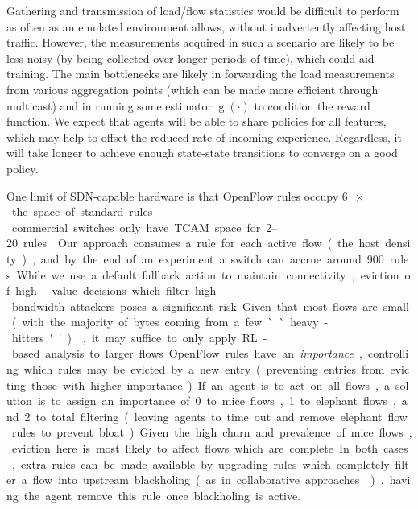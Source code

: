 \documentclass[10pt, times, comsoc]{IEEEtran}
\begin{document}
Gathering and transmission of load/flow statistics would be difficult to perform as often as an emulated environment allows, without inadvertently affecting host traffic.
However, the measurements acquired in such a scenario are likely to be less noisy (by being collected over longer periods of time), which could aid training.
The main bottlenecks are likely in forwarding the load measurements from various aggregation points (which can be made more efficient through multicast) and in running some estimator $\operatorname{g}(\cdot)$ to condition the reward function.
We expect that agents will be able to share policies for all features, which may help to offset the reduced rate of incoming experience.
Regardless, it will take longer to achieve enough state-state transitions to converge on a good policy.

\cbstart
{\color{revisiontext}One limit of SDN-capable hardware is that OpenFlow rules occupy \SI{6}{$\! \times$} the space of standard rules---commercial switches only have TCAM space for \SIrange{2}{20}{\kilo} rules \cite{DBLP:journals/comsur/NguyenSBT16}.
Our approach consumes a rule for each active flow (the host density), and by the end of an experiment a switch can accrue around \num{900} rules.
While we use a default fallback action to maintain connectivity, eviction of high-value decisions which filter high-bandwidth attackers poses a significant risk.
Given that most flows are small (with the majority of bytes coming from a few ``heavy-hitters'') \cite{DBLP:journals/ccr/PanBPS03}, it may suffice to only apply RL-based analysis to larger flows.
OpenFlow rules have an \emph{importance}, controlling which rules may be evicted by a new entry (preventing entries from evicting those with higher importance).
If an agent is to act on all flows, a solution is to assign an importance of 0 to mice flows, 1 to elephant flows, and 2 to total filtering (leaving agents to time out and remove elephant flow rules to prevent bloat).
Given the high churn and prevalence of mice flows, eviction here is most likely to affect flows which are complete.
In both cases, extra rules can be made available by upgrading rules which completely filter a flow into upstream blackholing (as in collaborative approaches \cite{DBLP:conf/acsac/RamanathanMYZ18}), having the agent remove this rule once blackholing is active.}
\cbend
\end{document}
